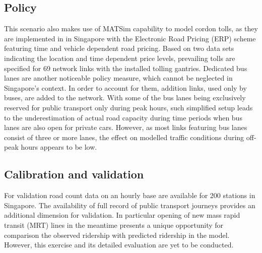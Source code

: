 \subsection{Policy}
This scenario also makes use of MATSim capability to model cordon tolls, as they are implemented in in Singapore with the Electronic Road Pricing (ERP) scheme featuring time and vehicle dependent road pricing. Based on two data sets indicating the location and time dependent price levels, prevailing tolls are specified for 69 network links with the installed tolling gantries. 
Dedicated bus lanes are another noticeable policy measure, which cannot be neglected in Singapore’s context. In order to account for them, addition links, used only by buses, are added to the network. With some of the bus lanes being exclusively reserved for public transport only during peak hours, such simplified setup leads to the underestimation of actual road capacity during time periods when bus lanes are also open for private cars. However, as most links featuring bus lanes consist of three or more lanes, the effect on modelled traffic conditions during off-peak hours appears to be low.

\subsection{Calibration and validation}
For validation road count data on an hourly base are available for 200 stations in Singapore. The availability of full record of public transport journeys provides an additional dimension for validation. In particular opening of new mass rapid transit (MRT) lines in the meantime presents a unique opportunity for comparison the observed ridership with predicted ridership in the model. However, this exercise and its detailed evaluation are yet to be conducted. 

